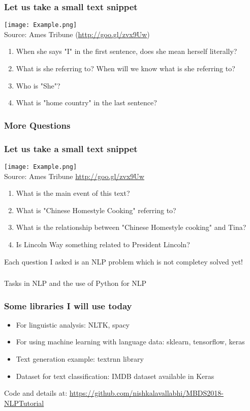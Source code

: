 \documentclass{beamer}
\begin{document}
\begin{frame}
\frametitle{Let us take a small text snippet}
\texttt{[image: Example.png]}
\\ \footnotesize{Source: Ames Tribune (\url{http://goo.gl/zvx9Uw})}

\begin{enumerate}
\item When she says "I" in the first sentence, does she mean herself literally? \pause
\item What is she referring to? When will we know what is she referring to? \pause
\item Who is "She"? \pause
\item What is "home country" in the last sentence?  
\end{enumerate}
\end{frame}

\begin{frame}
\frametitle{More Questions}
\frametitle{Let us take a small text snippet}
\texttt{[image: Example.png]}
\\ \footnotesize{Source: Ames Tribune \url{http://goo.gl/zvx9Uw}}
\begin{enumerate}
\item What is the main event of this text? \pause
\item What is "Chinese Homestyle Cooking" referring to? \pause
\item What is the relationship between "Chinese Homestyle cooking" and Tina? \pause
\item Is Lincoln Way something related to President Lincoln?
\end{enumerate}
\end{frame}

\begin{frame}
Each question I asked is an NLP problem which is not completey solved yet!
\end{frame} 

\begin{frame}
\frametitle{}
\Large Tasks in NLP and the use of Python for NLP \small
\end{frame}

\begin{frame}
\frametitle{Some libraries I will use today}
\begin{itemize}
\item For linguistic analysis: NLTK, spacy
\item For using machine learning with language data: sklearn, tensorflow, keras
\item Text generation example: textrnn library
\item Dataset for text classification: IMDB dataset available in Keras
\end{itemize}
Code and details at: \small \url{https://github.com/nishkalavallabhi/MBDS2018-NLPTutorial}
\end{frame}
\end{document}
